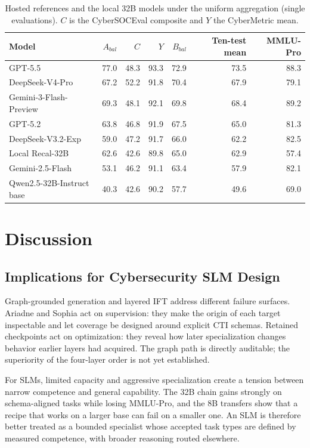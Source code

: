 \documentclass[conference]{IEEEtran}
\begin{document}
\begin{table}[t]
\caption{Hosted references and the local 32B models under the uniform aggregation (single evaluations). $C$ is the CyberSOCEval composite and $Y$ the CyberMetric mean.}
\label{tab:hosted}
\centering
\scriptsize
\setlength{\tabcolsep}{4.0pt}
\begin{tabular}{@{}lrrrrrr@{}}
\toprule
Model & $A_{bal}$ & $C$ & $Y$ & $B_{bal}$ & Ten-test mean & MMLU-Pro \\
\midrule
GPT-5.5 & 77.0 & 48.3 & 93.3 & 72.9 & 73.5 & 88.3 \\
DeepSeek-V4-Pro & 67.2 & 52.2 & 91.8 & 70.4 & 67.9 & 79.1 \\
Gemini-3-Flash-Preview & 69.3 & 48.1 & 92.1 & 69.8 & 68.4 & 89.2 \\
GPT-5.2 & 63.8 & 46.8 & 91.9 & 67.5 & 65.0 & 81.3 \\
DeepSeek-V3.2-Exp & 59.0 & 47.2 & 91.7 & 66.0 & 62.2 & 82.5 \\
Local Recal-32B & 62.6 & 42.6 & 89.8 & 65.0 & 62.9 & 57.4 \\
Gemini-2.5-Flash & 53.1 & 46.2 & 91.1 & 63.4 & 57.9 & 82.1 \\
Qwen2.5-32B-Instruct base & 40.3 & 42.6 & 90.2 & 57.7 & 49.6 & 69.0 \\
\bottomrule
\end{tabular}
\end{table}

\section{Discussion}\label{sec:discussion}
\subsection{Implications for Cybersecurity SLM Design}
Graph-grounded generation and layered IFT address different failure surfaces. Ariadne and Sophia act on supervision: they make the origin of each target inspectable and let coverage be designed around explicit CTI schemas. Retained checkpoints act on optimization: they reveal how later specialization changes behavior earlier layers had acquired. The graph path is directly auditable; the superiority of the four-layer order is not yet established.

For SLMs, limited capacity and aggressive specialization create a tension between narrow competence and general capability. The 32B chain gains strongly on schema-aligned tasks while losing MMLU-Pro, and the 8B transfers show that a recipe that works on a larger base can fail on a smaller one. An SLM is therefore better treated as a bounded specialist whose accepted task types are defined by measured competence, with broader reasoning routed elsewhere.
\end{document}
